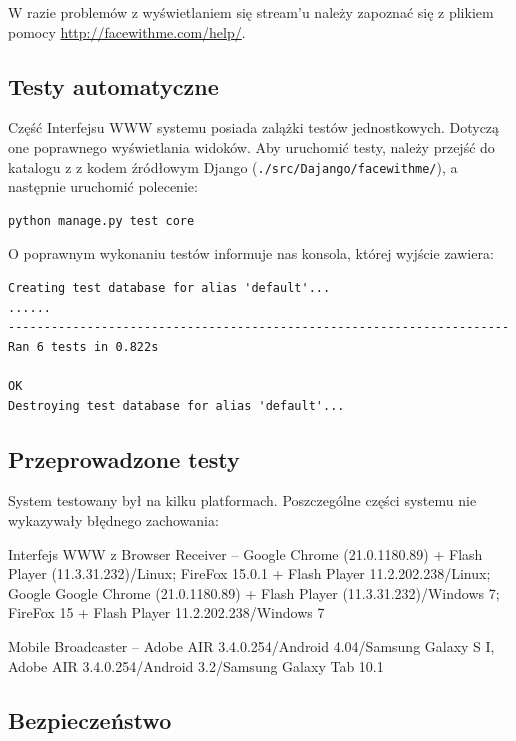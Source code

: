 W razie problemów z wyświetlaniem się stream'u należy zapoznać się z plikiem pomocy \url{http://facewithme.com/help/}.

\subsection{Testy automatyczne}

Część Interfejsu WWW systemu posiada zalążki testów jednostkowych. Dotyczą one poprawnego wyświetlania widoków. Aby uruchomić testy, należy przejść do katalogu z z kodem źródłowym Django (\texttt{./src/Dajango/facewithme/}), a następnie uruchomić polecenie:

\lstset{language=Bash}
\begin{lstlisting}
python manage.py test core
\end{lstlisting}

O poprawnym wykonaniu testów informuje nas konsola, której wyjście zawiera:
\begin{lstlisting}
Creating test database for alias 'default'...
......
----------------------------------------------------------------------
Ran 6 tests in 0.822s

OK
Destroying test database for alias 'default'...
\end{lstlisting}

\subsection{Przeprowadzone testy}

System testowany był na kilku platformach. Poszczególne części systemu nie wykazywały błędnego zachowania:

\begin{packed_item}
    \item{Interfejs WWW z Browser Receiver -- Google Chrome (21.0.1180.89) + Flash Player (11.3.31.232)/Linux; FireFox 15.0.1 + Flash Player 11.2.202.238/Linux; Google Google Chrome (21.0.1180.89) + Flash Player (11.3.31.232)/Windows 7;  FireFox 15 + Flash Player 11.2.202.238/Windows 7}
    \item{Mobile Broadcaster -- Adobe AIR 3.4.0.254/Android 4.04/Samsung Galaxy S I, Adobe AIR 3.4.0.254/Android 3.2/Samsung Galaxy Tab 10.1}
\end{packed_item}

\subsection{Bezpieczeństwo}

